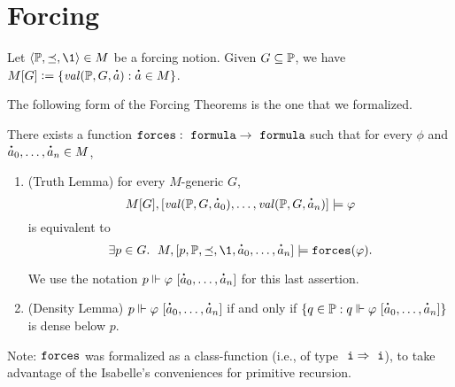 \section{Forcing}
\label{sec:forcing}
Let $\lb \PP, {\preceq} ,\1\rb \in M$ be a forcing notion. Given $G\subseteq \mathbb{P}$, we have
$M[G]\defi \{ \val(\PP,G,\punto{a}) : \punto{a}\in M \}$.

The following form of the Forcing Theorems  is the one
that we formalized.
\begin{theorem}
  There exists a function  $\forceisa: \formula \to  \formula$
  such that for every
  $\phi$ and $\punto{a}_0,\dots,\punto{a}_n\in M$,
  \begin{enumerate}
  \item (Truth Lemma) for every $M$-generic $G$,
    \[
      M[G], [\val(\PP,G,\punto{a}_0),\dots,\val(\PP,G,\punto{a}_n)]
      \models \phi
    \]
    is equivalent to 
    \[
      \exists p\in G.\ \; M, [p,\PP,\preceq,\1, \punto{a}_0,\dots,\punto{a}_n]  \models
      \forceisa(\phi).\]

    We use the notation $p \forces
    \phi\ [\punto{a}_0,\dots,\punto{a}_n]$ for this last assertion.
  \item (Density Lemma) $p \forces \phi\ [\punto{a}_0,\dots,\punto{a}_n]$
    if and only if 
    $\{q\in \PP :  q \forces \phi\ [\punto{a}_0,\dots,\punto{a}_n]\}$
    is dense below $p$.
  \end{enumerate}
\end{theorem}

Note: $\mathop{\mathtt{forces}}$ was formalized as a class-function (i.e., of type
$\tyi\Rightarrow\tyi$), to take advantage of the Isabelle's
conveniences for primitive recursion.

